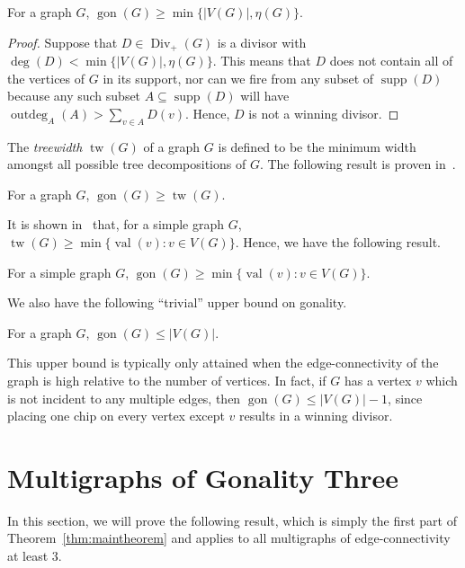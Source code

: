 \documentclass[ALCO,ThmDefs,Unicode,epreuves]{cedram}
\DeclareMathOperator{\gon}{gon}
\DeclareMathOperator{\val}{val}
\DeclareMathOperator{\tw}{tw}
\DeclareMathOperator{\Div}{Div}
\DeclareMathOperator{\supp}{supp}
\DeclareMathOperator{\outdeg}{outdeg}
\begin{document}
\begin{lemma}
\label{lemma:eta}
For a graph $G$, $\gon (G) \geq \min \{|V(G)|, \eta(G)\}$.
\end{lemma}

\begin{proof}
Suppose that $D \in \Div _+(G)$ is a divisor with $\deg (D) < \min \{ |V(G)|, \eta(G) \}$. This means that $D$ does not contain all of the vertices of $G$ in its support, nor can we fire from any subset of $\supp (D)$ because any such subset $A \subseteq \supp (D)$ will have $\outdeg _A(A) > \sum_{v \in A} D(v)$. Hence, $D$ is not a winning divisor.
\end{proof}

The \emph{treewidth} $\tw (G)$ of a graph $G$ is defined to be the minimum width amongst all possible tree decompositions of $G$. The following result is proven in~\cite{dbg}.

\begin{lemma}
\label{ref:treewidth}
For a graph $G$, $\gon (G) \geq \tw (G)$.
\end{lemma}

It is shown in~\cite{two} that, for a simple graph $G$, $\tw (G) \geq \min \{\val (v) : v \in V(G) \}$. Hence, we have the following result.

\begin{lemma}
\label{lemma:minvalence}
For a simple graph $G$, $\gon (G) \geq \min \{ \val (v) : v \in V(G) \}$.
\end{lemma}

We also have the following ``trivial'' upper bound on gonality.

\begin{lemma}
\label{lemma:upperbound}
For a graph $G$, $\gon (G) \leq |V(G)|$.
\end{lemma}

This upper bound is typically only attained when the edge-connectivity of the graph is high relative to the number of vertices. In fact, if $G$ has a vertex $v$ which is not incident to any multiple edges, then $\gon (G) \leq |V(G)|-1$, since placing one chip on every vertex except $v$ results in a winning divisor.

\section{Multigraphs of Gonality Three}
\label{section:multi}

In this section, we will prove the following result, which is simply the first part of Theorem~\ref{thm:maintheorem} and applies to all multigraphs of edge-connectivity at least $3$. 
\end{document}
